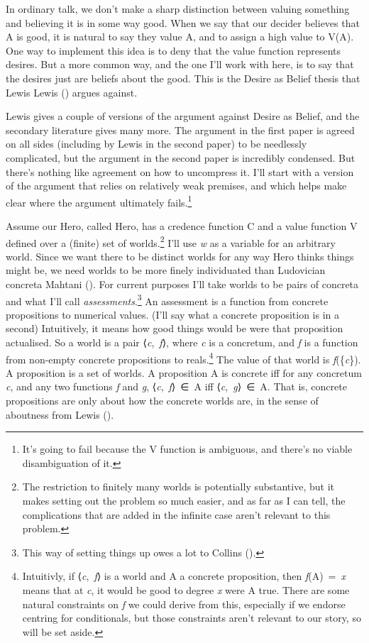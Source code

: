 \documentclass[
  10pt,
  letterpaper,
  DIV=11,
  numbers=noendperiod,
  twoside]{scrartcl}
\begin{document}
In ordinary talk, we don't make a sharp distinction between valuing
something and believing it is in some way good. When we say that our
decider believes that A is good, it is natural to say they value A, and
to assign a high value to V(A). One way to implement this idea is to
deny that the value function represents desires. But a more common way,
and the one I'll work with here, is to say that the desires just are
beliefs about the good. This is the Desire as Belief thesis that Lewis
Lewis () argues against.

Lewis gives a couple of versions of the argument against Desire as
Belief, and the secondary literature gives many more. The argument in
the first paper is agreed on all sides (including by Lewis in the second
paper) to be needlessly complicated, but the argument in the second
paper is incredibly condensed. But there's nothing like agreement on how
to uncompress it. I'll start with a version of the argument that relies
on relatively weak premises, and which helps make clear where the
argument ultimately fails.\footnote{It's going to fail because the V
  function is ambiguous, and there's no viable disambiguation of it.}

Assume our Hero, called Hero, has a credence function C and a value
function V defined over a (finite) set of worlds.\footnote{The
  restriction to finitely many worlds is potentially substantive, but it
  makes setting out the problem so much easier, and as far as I can
  tell, the complications that are added in the infinite case aren't
  relevant to this problem.} I'll use \emph{w} as a variable for an
arbitrary world. Since we want there to be distinct worlds for any way
Hero thinks things might be, we need worlds to be more finely
individuated than Ludovician concreta Mahtani
(). For current purposes I'll take
worlds to be pairs of concreta and what I'll call
\emph{assessments}.\footnote{This way of setting things up owes a lot to
  Collins ().} An assessment is a
function from concrete propositions to numerical values. (I'll say what
a concrete proposition is in a second) Intuitively, it means how good
things would be were that proposition actualised. So a world is a pair
⟨\emph{c},~\emph{f}⟩, where \emph{c} is a concretum, and \emph{f} is a
function from non-empty concrete propositions to reals.\footnote{Intuitivly,
  if ⟨\emph{c},~\emph{f}⟩ is a world and A a concrete proposition, then
  \emph{f}(A)~=~\emph{x} means that at \emph{c}, it would be good to
  degree \emph{x} were A true. There are some natural constraints on
  \emph{f} we could derive from this, especially if we endorse centring
  for conditionals, but those constraints aren't relevant to our story,
  so will be set aside.} The value of that world is
\emph{f}(\{\emph{c}\}). A proposition is a set of worlds. A proposition
A is concrete iff for any concretum \emph{c}, and any two functions
\emph{f} and \emph{g}, ⟨\emph{c},~\emph{f}⟩~∈~A iff
⟨\emph{c},~\emph{g}⟩~∈~A. That is, concrete propositions are only about
how the concrete worlds are, in the sense of aboutness from Lewis
().
\end{document}
